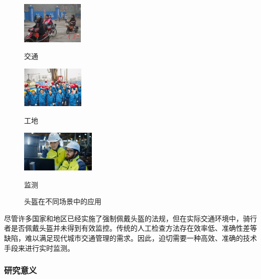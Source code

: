 \documentclass[journal]{IEEEtran}
\numberwithin{figure}{section}%
\begin{document}
\begin{figure}[h]
	
	\begin{minipage}{0.32\linewidth}
		\vspace{3pt}
		\centerline{\includegraphics[width=\textwidth,height=2cm]{figures/1_1.jpg}}
		\centerline{交通}
	\end{minipage}
	\begin{minipage}{0.32\linewidth}
		\vspace{3pt}
		\centerline{\includegraphics[width=\textwidth,height=2cm]{figures/1_2.jpg}}
	 
		\centerline{工地}
	\end{minipage}
	\begin{minipage}{0.32\linewidth}
		\vspace{3pt}
		\centerline{\includegraphics[width=\textwidth,height=2cm]{figures/1_3.jpg}}
	 
		\centerline{监测}
	\end{minipage}
 
	\caption{头盔在不同场景中的应用}
	\label{fig4}
\end{figure}

尽管许多国家和地区已经实施了强制佩戴头盔的法规，但在实际交通环境中，骑行者是否佩戴头盔并未得到有效监控。传统的人工检查方法存在效率低、准确性差等缺陷，难以满足现代城市交通管理的需求。因此，迫切需要一种高效、准确的技术手段来进行实时监测。
\subsubsection{研究意义}
\end{document}
